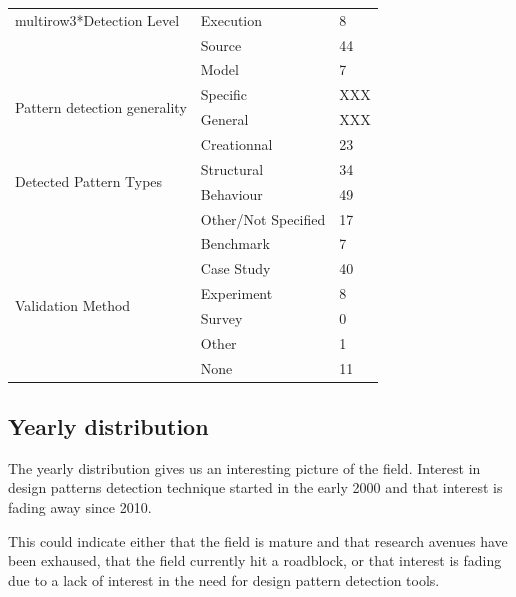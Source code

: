 \documentclass[letterpaper, 10 pt, conference]{ieeeconf}  %
\begin{document}
\begin{center}
\begin{tabular}{ lll }
    \hline
    multirow{3}{*}{Detection Level}
    & \multicolumn{1}{l}{Execution}    & \multicolumn{1}{l}{8} \\
    & \multicolumn{1}{l}{Source}       & \multicolumn{1}{l}{44} \\
    & \multicolumn{1}{l}{Model}        & \multicolumn{1}{l}{7} \\
    \hline
    \multirow{2}{*}{Pattern detection generality}
    & \multicolumn{1}{l}{Specific}     & \multicolumn{1}{l}{XXX} \\
    & \multicolumn{1}{l}{General}      & \multicolumn{1}{l}{XXX} \\
    \hline
    \multirow{4}{*}{Detected Pattern Types}
    & \multicolumn{1}{l}{Creationnal}  & \multicolumn{1}{l}{23} \\
    & \multicolumn{1}{l}{Structural}   & \multicolumn{1}{l}{34} \\
    & \multicolumn{1}{l}{Behaviour}    & \multicolumn{1}{l}{49} \\
    & \multicolumn{1}{l}{Other/Not Specified}
                                       & \multicolumn{1}{l}{17} \\
    \hline
    \multirow{6}{*}{Validation Method}
    & \multicolumn{1}{l}{Benchmark}    & \multicolumn{1}{l}{7} \\
    & \multicolumn{1}{l}{Case Study}   & \multicolumn{1}{l}{40} \\
    & \multicolumn{1}{l}{Experiment}   & \multicolumn{1}{l}{8} \\
    & \multicolumn{1}{l}{Survey}       & \multicolumn{1}{l}{0} \\
    & \multicolumn{1}{l}{Other}        & \multicolumn{1}{l}{1} \\
    & \multicolumn{1}{l}{None}         & \multicolumn{1}{l}{11}
  \end{tabular}
\end{center}

\subsection{Yearly distribution}

The yearly distribution gives us an interesting picture of the field.
Interest in design patterns detection technique started in the early
2000 and that interest is fading away since 2010.

This could indicate either that the field is mature and that research avenues
have been exhaused, that the field currently hit a roadblock, or that interest
is fading due to a lack of interest in the need for design pattern detection
tools.
\end{document}
